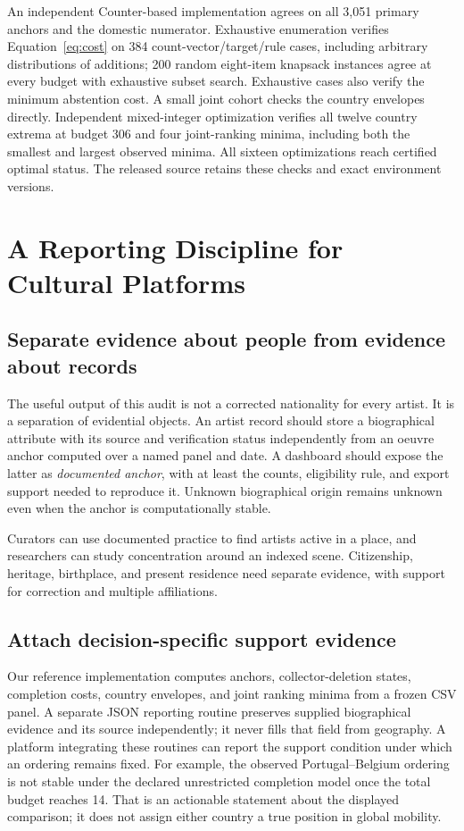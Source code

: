 An independent Counter-based implementation agrees on all 3,051 primary anchors and the domestic numerator. Exhaustive enumeration verifies Equation~\ref{eq:cost} on 384 count-vector/target/rule cases, including arbitrary distributions of additions; 200 random eight-item knapsack instances agree at every budget with exhaustive subset search. Exhaustive cases also verify the minimum abstention cost. A small joint cohort checks the country envelopes directly. Independent mixed-integer optimization verifies all twelve country extrema at budget 306 and four joint-ranking minima, including both the smallest and largest observed minima. All sixteen optimizations reach certified optimal status. The released source retains these checks and exact environment versions.

\section{A Reporting Discipline for Cultural Platforms}
\subsection{Separate evidence about people from evidence about records}
The useful output of this audit is not a corrected nationality for every artist. It is a separation of evidential objects. An artist record should store a biographical attribute with its source and verification status independently from an oeuvre anchor computed over a named panel and date. A dashboard should expose the latter as \emph{documented anchor}, with at least the counts, eligibility rule, and export support needed to reproduce it. Unknown biographical origin remains unknown even when the anchor is computationally stable.

Curators can use documented practice to find artists active in a place, and researchers can study concentration around an indexed scene. Citizenship, heritage, birthplace, and present residence need separate evidence, with support for correction and multiple affiliations.

\subsection{Attach decision-specific support evidence}
Our reference implementation computes anchors, collector-deletion states, completion costs, country envelopes, and joint ranking minima from a frozen CSV panel. A separate JSON reporting routine preserves supplied biographical evidence and its source independently; it never fills that field from geography. A platform integrating these routines can report the support condition under which an ordering remains fixed. For example, the observed Portugal--Belgium ordering is not stable under the declared unrestricted completion model once the total budget reaches 14. That is an actionable statement about the displayed comparison; it does not assign either country a true position in global mobility.

